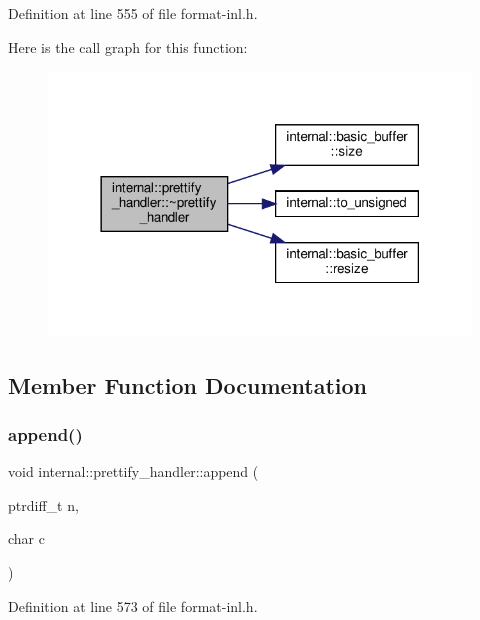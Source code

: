 Definition at line 555 of file format-\/inl.\+h.

Here is the call graph for this function\+:
\nopagebreak
\begin{figure}[H]
\begin{center}
\leavevmode
\includegraphics[width=318pt]{structinternal_1_1prettify__handler_a96f87d5af83e2986ccff6090aba6e228_cgraph}
\end{center}
\end{figure}


\subsection{Member Function Documentation}
\mbox{\label{structinternal_1_1prettify__handler_a9b5bdd4a4766ef7321206498ed201132}} 
\subsubsection{\texorpdfstring{append()}{append()}\hspace{0.1cm}{\footnotesize\ttfamily [1/2]}}
{\footnotesize\ttfamily void internal\+::prettify\+\_\+handler\+::append (\begin{DoxyParamCaption}\item[{ptrdiff\+\_\+t}]{n,  }\item[{char}]{c }\end{DoxyParamCaption})\hspace{0.3cm}{\ttfamily [inline]}}



Definition at line 573 of file format-\/inl.\+h.

